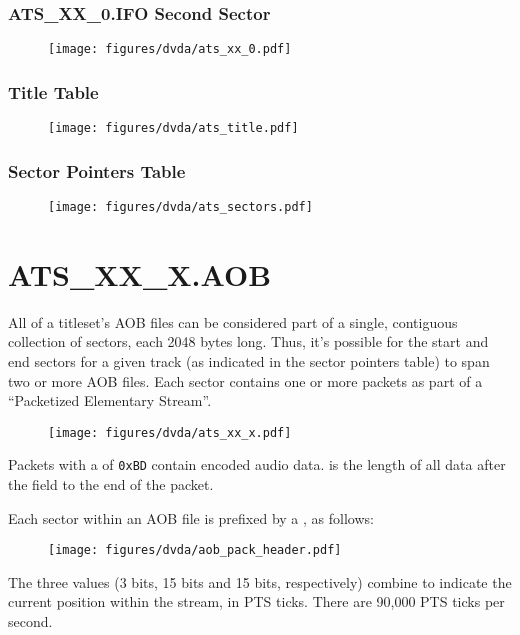\clearpage

\subsubsection{ATS\_XX\_0.IFO Second Sector}
\begin{figure}[h]
\texttt{[image: figures/dvda/ats\_xx\_0.pdf]}
\end{figure}

\subsubsection{Title Table}
\begin{figure}[h]
  \texttt{[image: figures/dvda/ats\_title.pdf]}
\end{figure}

\subsubsection{Sector Pointers Table}
\begin{figure}[h]
  \texttt{[image: figures/dvda/ats\_sectors.pdf]}
\end{figure}

\clearpage

\section{ATS\_XX\_X.AOB}

All of a titleset's AOB files can be considered part of a
single, contiguous collection of sectors, each 2048 bytes long.
Thus, it's possible for the start and end sectors for a given track
(as indicated in the sector pointers table) to span two or more
AOB files.
Each sector contains one or more packets as part of a
``Packetized Elementary Stream''.

\begin{figure}[h]
  \texttt{[image: figures/dvda/ats\_xx\_x.pdf]}
\end{figure}
\par
\noindent
Packets with a  of \texttt{0xBD} contain encoded audio data.
 is the length of all data after
the  field to the end of the packet.
\par
\noindent
Each sector within an AOB file is prefixed by a ,
as follows:
\begin{figure}[h]
  \texttt{[image: figures/dvda/aob\_pack\_header.pdf]}
\end{figure}
\par
\noindent
The three  values (3 bits, 15 bits and 15 bits, respectively)
combine to indicate the current position within the stream, in PTS ticks.
There are 90,000 PTS ticks per second.

